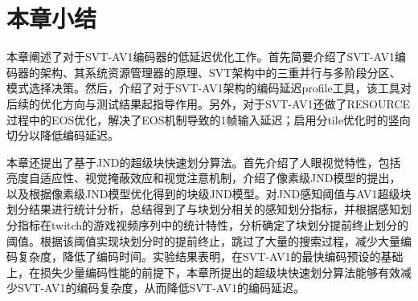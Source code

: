   \section{本章小结}
  本章阐述了对于SVT-AV1编码器的低延迟优化工作。首先简要介绍了SVT-AV1编码器的架构、其系统资源管理器的原理、SVT架构中的三重并行与多阶段分区、模式选择决策。然后，介绍了对于SVT-AV1架构的编码延迟profile工具，该工具对后续的优化方向与测试结果起指导作用。另外，对于SVT-AV1还做了RESOURCE过程中的EOS优化，解决了EOS机制导致的1帧输入延迟；启用分tile优化时的竖向切分以降低编码延迟。

  本章还提出了基于JND的超级块快速划分算法。首先介绍了人眼视觉特性，包括亮度自适应性、视觉掩蔽效应和视觉注意机制，介绍了像素级JND模型的提出，以及根据像素级JND模型优化得到的块级JND模型。对JND感知阈值与AV1超级块划分结果进行统计分析，总结得到了与块划分相关的感知划分指标，并根据感知划分指标在twitch的游戏视频序列中的统计特性，分析确定了块划分提前终止划分的阈值。根据该阈值实现块划分时的提前终止，跳过了大量的搜索过程，减少大量编码复杂度，降低了编码时间。实验结果表明，在SVT-AV1的最快编码预设的基础上，在损失少量编码性能的前提下，本章所提出的超级块快速划分算法能够有效减少SVT-AV1的编码复杂度，从而降低SVT-AV1的编码延迟。
